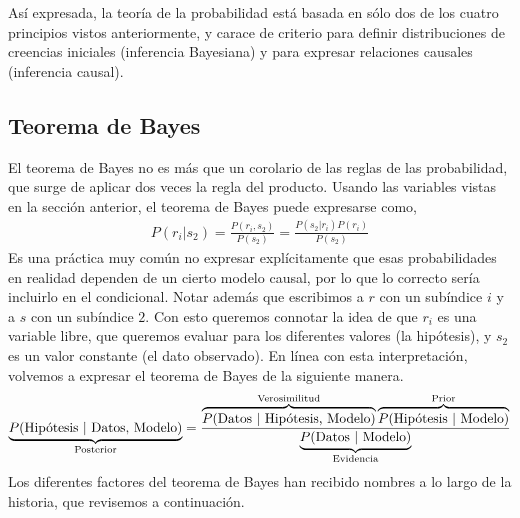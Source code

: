\documentclass[a4paper,10pt]{book}
\theoremstyle{definition}
\begin{document}

Así expresada, la teoría de la probabilidad está basada en sólo dos de los cuatro principios vistos anteriormente, y carace de criterio para definir distribuciones de creencias iniciales (inferencia Bayesiana) y para expresar relaciones causales (inferencia causal).

\subsection{Teorema de Bayes}

El teorema de Bayes no es más que un corolario de las reglas de las probabilidad, que surge de aplicar dos veces la regla del producto.
%
Usando las variables vistas en la sección anterior, el teorema de Bayes puede expresarse como,
\begin{equation}
\begin{split}
P(r_i|s_2) = \frac{P(r_i, s_2)}{P(s_2)} = \frac{P(s_2|r_i)P(r_i)}{P(s_2)} 
\end{split}
\end{equation}
%
Es una práctica muy común no expresar explícitamente que esas probabilidades en realidad dependen de un cierto modelo causal, por lo que lo correcto sería incluirlo en el condicional.
%
Notar además que escribimos a $r$ con un subíndice $i$ y a $s$ con un subíndice $2$.
%
Con esto queremos connotar la idea de que $r_i$ es una variable libre, que queremos evaluar para los diferentes valores (la hipótesis), y $s_2$ es un valor constante (el dato observado).
%
En línea con esta interpretación, volvemos a expresar el teorema de Bayes de la siguiente manera.
%
\begin{equation*}
\underbrace{P(\text{Hip\'otesis }|\text{ Datos, Modelo})}_{\text{\scriptsize Posterior}} = \frac{\overbrace{P(\text{Datos }|\text{ Hip\'otesis, Modelo})}^{\text{\scriptsize Verosimilitud}} \overbrace{P(\text{Hip\'otesis }|\text{ Modelo})}^{\text{\scriptsize Prior}} }{\underbrace{P(\text{Datos }|\text{ Modelo})}_{\text{\scriptsize Evidencia}}}
\end{equation*}
%
Los diferentes factores del teorema de Bayes han recibido nombres a lo largo de la historia, que revisemos a continuación.
\end{document}
